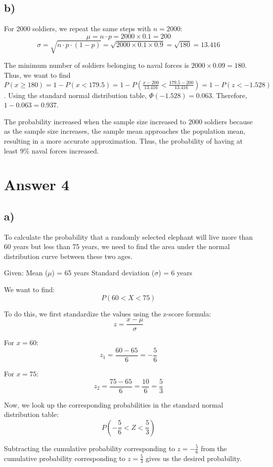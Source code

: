 \documentclass[12pt]{article}
\begin{document}
\subsection*{b)} 
 For 2000 soldiers, we repeat the same steps with \(n = 2000\):
\[
\mu = n\cdot p  =2000 \times 0.1 = 200
\]
\[
\sigma = \sqrt{ n\cdot p\cdot (1 - p) } = \sqrt{2000 \times 0.1 \times 0.9} = \sqrt{180} = 13.416
\]

The minimum number of soldiers belonging to naval forces is \(2000 \times 0.09 = 180\). Thus, we want to find \(P(x \geq 180) = 1 - P(x < 179.5) = 1 - P\left(\frac{x - 200}{13.416} < \frac{179.5 - 200}{13.416}\right) = 1 - P(z < -1.528)\). Using the standard normal distribution table, \(\Phi(-1.528) = 0.063\). Therefore, \(1 - 0.063 = 0.937\).

The probability increased when the sample size increased to 2000 soldiers because as the sample size increases, the sample mean approaches the population mean, resulting in a more accurate approximation. Thus, the probability of having at least 9\% naval forces increased.
\section*{Answer 4}
\subsection*{a)} 
To calculate the probability that a randomly selected elephant will live more than 60 years but less than 75 years, we need to find the area under the normal distribution curve between these two ages.

Given:
Mean (\( \mu \)) = 65 years
Standard deviation (\( \sigma \)) = 6 years

We want to find:
\[ P(60 < X < 75) \]

To do this, we first standardize the values using the z-score formula:
\[ z = \frac{x - \mu}{\sigma} \]

For \( x = 60 \):
\[ z_1 = \frac{60 - 65}{6} = -\frac{5}{6} \]

For \( x = 75 \):
\[ z_2 = \frac{75 - 65}{6} = \frac{10}{6} = \frac{5}{3} \]

Now, we look up the corresponding probabilities in the standard normal distribution table:
\[ P(-\frac{5}{6} < Z < \frac{5}{3}) \]

Subtracting the cumulative probability corresponding to \( z = -\frac{5}{6} \) from the cumulative probability corresponding to \( z = \frac{5}{3} \) gives us the desired probability.
\end{document}
